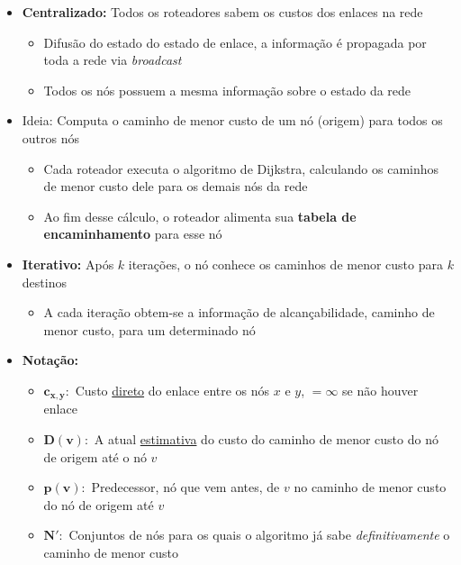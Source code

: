             \begin{itemize}[left=0.5cm, align=left, nosep]
                \item \textbf{Centralizado:} Todos os roteadores sabem os custos dos enlaces na rede
                \begin{itemize}[left=0.5cm, nosep, label=$\hookrightarrow$]
                    \item Difusão do estado do estado de enlace, a informação é propagada por toda a rede via \textit{broadcast}
                    \item Todos os nós possuem a mesma informação sobre o estado da rede 
                \end{itemize}
                \item Ideia: Computa o caminho de menor custo de um nó (origem) para todos os outros nós
                \begin{itemize}[left=0.5cm, nosep, label=$\hookrightarrow$]
                    \item Cada roteador executa o algoritmo de Dijkstra, calculando os caminhos de menor custo dele para os demais nós da rede
                    \item Ao fim desse cálculo, o roteador alimenta sua \textbf{tabela de encaminhamento} para esse nó  
                \end{itemize}
                \item \textbf{Iterativo:} Após $k$ iterações, o nó conhece os caminhos de menor custo para $k$ destinos  
                \begin{itemize}[left=0.5cm, nosep, label=$\hookrightarrow$]
                    \item A cada iteração obtem-se a informação de alcançabilidade, caminho de menor custo, para um determinado nó  
                \end{itemize}   
                \item \textbf{Notação:} 
                \begin{itemize}[left=0.5cm, nosep, label=$\hookrightarrow$]
                    \item $\mathbf{c_{x,y}}:$ Custo \underline{direto} do enlace entre os nós $x$ e $y$, $= \infty$ se não houver enlace
                    \item $\mathbf{D(v)}:$ A atual \underline{estimativa} do custo do caminho de menor custo do nó de origem até o nó $v$
                    \item $\mathbf{p(v)}:$ Predecessor, nó que vem antes, de $v$ no caminho de menor custo do nó de origem até $v$
                    \item $\mathbf{N'}:$ Conjuntos de nós para os quais o algoritmo já sabe \textit{definitivamente} o caminho de menor custo
                \end{itemize}
            \end{itemize}
        
